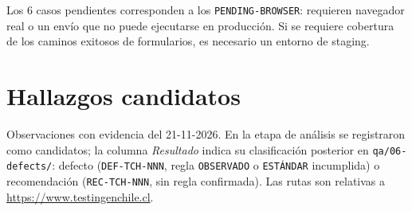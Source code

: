 \documentclass[11pt,a4paper]{article}
\newcommand{\code}[1]{\texttt{#1}}
\begin{document}
Los 6 casos pendientes corresponden a los \code{PENDING-BROWSER}: requieren navegador real o
un envío que no puede ejecutarse en producción. Si se requiere cobertura de los caminos
exitosos de formularios, es necesario un entorno de staging.

\section{Hallazgos candidatos}

Observaciones con evidencia del \mbox{21-11-2026}. En la etapa de análisis se registraron como
candidatos; la columna \emph{Resultado} indica su clasificación posterior en
\code{qa/06-defects/}: defecto (\code{DEF-TCH-NNN}, regla \code{OBSERVADO} o \code{ESTÁNDAR}
incumplida) o recomendación (\code{REC-TCH-NNN}, sin regla confirmada). Las rutas son
relativas a \url{https://www.testingenchile.cl}.
\end{document}
